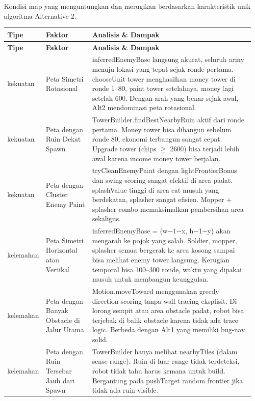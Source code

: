 \documentclass{article}
\begin{document}
\begin{enumerate}[label=\alph*.]

Kondisi map yang menguntungkan dan merugikan berdasarkan karakteristik unik algoritma Alternative 2.

\begin{longtable}{|p{2cm}|p{3.5cm}|p{8.5cm}|}
\hline
\textbf{Tipe} & \textbf{Faktor} & \textbf{Analisis \& Dampak} \\
\hline
\endfirsthead
\hline
\textbf{Tipe} & \textbf{Faktor} & \textbf{Analisis \& Dampak} \\
\hline
\endhead
\hline
\endfoot
kekuatan
& Peta Simetri Rotasional
& inferredEnemyBase langsung akurat, seluruh army menuju lokasi yang tepat sejak ronde pertama.
chooseUnit tower menghasilkan money tower di ronde 1--80, paint tower setelahnya, money lagi setelah 600.
Dengan arah yang benar sejak awal, Alt2 mendominasi peta rotasional. \\
\hline
kekuatan
& Peta dengan Ruin Dekat Spawn
& TowerBuilder.findBestNearbyRuin aktif dari ronde pertama.
Money tower bisa dibangun sebelum ronde 80, ekonomi terbangun sangat cepat.
Upgrade tower (chips $\geq$ 2600) bisa terjadi lebih awal karena income money tower berjalan. \\
\hline
kekuatan
& Peta dengan Cluster Enemy Paint
& tryCleanEnemyPaint dengan lightFrontierBonus dan swing scoring sangat efektif di area padat.
splashValue tinggi di area cat musuh yang berdekatan, splasher sangat efisien.
Mopper + splasher combo memaksimalkan pembersihan area sekaligus. \\
\hline
kelemahan
& Peta Simetri Horizontal atau Vertikal
& inferredEnemyBase = (w$-$1$-$x, h$-$1$-$y) akan mengarah ke pojok yang salah.
Soldier, mopper, splasher semua bergerak ke area kosong sampai bisa melihat enemy tower langsung.
Kerugian temporal bisa 100--300 ronde, waktu yang dipakai musuh untuk membangun keunggulan. \\
\hline
kelemahan
& Peta dengan Banyak Obstacle di Jalur Utama
& Motion.moveToward menggunakan greedy direction scoring tanpa wall tracing eksplisit.
Di lorong sempit atau area obstacle padat, robot bisa terjebak di balik obstacle karena tidak ada trace logic.
Berbeda dengan Alt1 yang memiliki bug-nav solid. \\
\hline
kelemahan
& Peta dengan Ruin Tersebar Jauh dari Spawn
& TowerBuilder hanya melihat nearbyTiles (dalam sense range).
Ruin di luar range tidak terdeteksi, robot tidak tahu harus kemana untuk build.
Bergantung pada pushTarget random frontier jika tidak ada ruin visible. \\
\hline
\end{longtable}


\end{enumerate}
\end{document}

